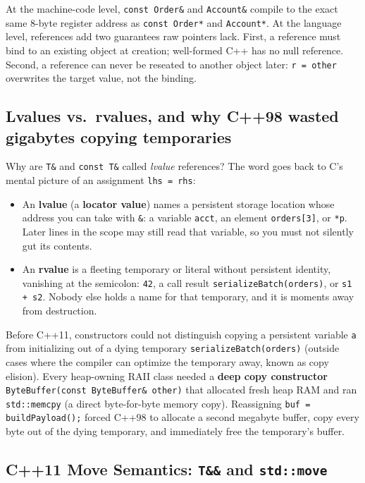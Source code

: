 At the machine-code level, \texttt{const Order\&} and \texttt{Account\&} compile to the exact same 8-byte register address as \texttt{const Order*} and \texttt{Account*}. At the language level, references add two guarantees raw pointers lack. First, a reference must bind to an existing object at creation; well-formed C++ has no null reference. Second, a reference can never be reseated to another object later: \texttt{r = other} overwrites the target value, not the binding.

\subsection{Lvalues vs.\ rvalues, and why C++98 wasted gigabytes copying temporaries}

Why are \texttt{T\&} and \texttt{const T\&} called \emph{lvalue} references? The word goes back to C's mental picture of an assignment \texttt{lhs = rhs}:
\begin{itemize}
  \item An \textbf{lvalue} (a \textbf{locator value}) names a persistent storage location whose address you can take with \texttt{\&}: a variable \texttt{acct}, an element \texttt{orders[3]}, or \texttt{*p}. Later lines in the scope may still read that variable, so you must not silently gut its contents.
  \item An \textbf{rvalue} is a fleeting temporary or literal without persistent identity, vanishing at the semicolon: \texttt{42}, a call result \texttt{serializeBatch(orders)}, or \texttt{s1 + s2}. Nobody else holds a name for that temporary, and it is moments away from destruction.
\end{itemize}

Before C++11, constructors could not distinguish copying a persistent variable \texttt{a} from initializing out of a dying temporary \texttt{serializeBatch(orders)} (outside cases where the compiler can optimize the temporary away, known as copy elision). Every heap-owning RAII class needed a \textbf{deep copy constructor} \texttt{ByteBuffer(const ByteBuffer\&\allowbreak\ other)} that allocated fresh heap RAM and ran \texttt{std::memcpy} (a direct byte-for-byte memory copy). Reassigning \texttt{buf = buildPayload();} forced C++98 to allocate a second megabyte buffer, copy every byte out of the dying temporary, and immediately free the temporary's buffer.

\subsection{C++11 Move Semantics: \texttt{T\&\&} and \texttt{std::move}}

